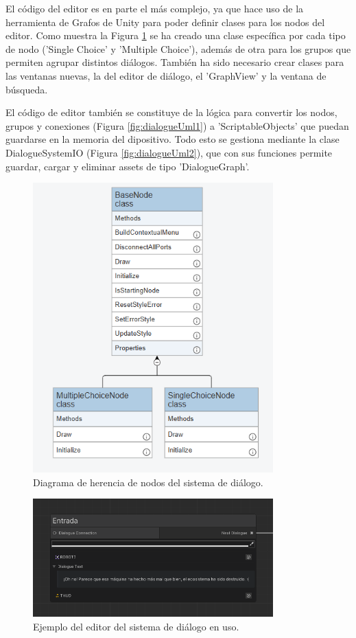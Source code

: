 El código del editor es en parte el más complejo, ya que hace uso de la herramienta de Grafos de Unity para poder definir clases para los nodos del editor. Como muestra la 
Figura \ref{fig:nodos} se ha creado una clase específica por cada tipo de nodo ('Single Choice' y 'Multiple Choice'), además de otra para los grupos que permiten agrupar distintos 
diálogos. También ha sido necesario crear clases para las ventanas nuevas, la del editor de diálogo, el 'GraphView' y la ventana de búsqueda.

El código de editor también se constituye de la lógica para convertir los nodos, grupos y conexiones (Figura \ref{fig:dialogueUml1}) a 'ScriptableObjects' que puedan guardarse en la memoria del dipositivo. Todo esto se gestiona mediante la clase
DialogueSystemIO (Figura \ref{fig:dialogueUml2}), que con sus funciones permite guardar, cargar y eliminar assets de tipo 'DialogueGraph'.  

\begin{figure}[H]
  \centering
    \includegraphics[width=350px,clip=true]{Node_Herencia.png}
  \caption{Diagrama de herencia de nodos del sistema de diálogo.}
  \label{fig:nodos}
\end{figure}

\begin{figure}[H]
  \centering
    \includegraphics[width=350px,clip=true]{dialogue.png}
  \caption{Ejemplo del editor del sistema de diálogo en uso.}
  \label{fig:dialogueEditorExample}
\end{figure}


